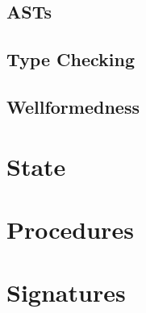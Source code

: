 \subsection*{ASTs}
\subsection*{Type Checking}
\subsection*{Wellformedness}

\section{State}



\section{Procedures}



\section{Signatures}




